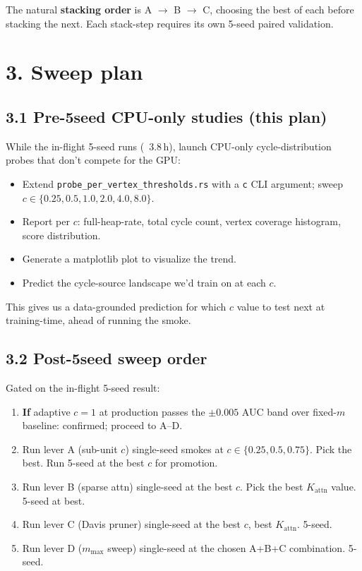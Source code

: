\documentclass[a4paper,11pt]{article}
\begin{document}
The natural \textbf{stacking order} is A $\to$ B $\to$ C, choosing
the best of each before stacking the next.  Each stack-step requires
its own 5-seed paired validation.

\section*{3. Sweep plan}

\subsection*{3.1 Pre-5seed CPU-only studies (this plan)}

While the in-flight 5-seed runs (~3.8\,h), launch CPU-only
cycle-distribution probes that don't compete for the GPU:

\begin{itemize}
  \item Extend \texttt{probe\_per\_vertex\_thresholds.rs} with a
    \texttt{c} CLI argument; sweep $c \in
    \{0.25, 0.5, 1.0, 2.0, 4.0, 8.0\}$.
  \item Report per $c$: full-heap-rate, total cycle count, vertex
    coverage histogram, score distribution.
  \item Generate a matplotlib plot to visualize the trend.
  \item Predict the cycle-source landscape we'd train on at each $c$.
\end{itemize}

This gives us a data-grounded prediction for which $c$ value to test
next at training-time, ahead of running the smoke.

\subsection*{3.2 Post-5seed sweep order}

Gated on the in-flight 5-seed result:

\begin{enumerate}
  \item \textbf{If} adaptive $c{=}1$ at production passes the
    $\pm 0.005$ AUC band over fixed-$m$ baseline: confirmed; proceed
    to A--D.
  \item Run lever A (sub-unit $c$) single-seed smokes at
    $c \in \{0.25, 0.5, 0.75\}$.  Pick the best.  Run 5-seed at the
    best $c$ for promotion.
  \item Run lever B (sparse attn) single-seed at the best $c$.  Pick
    the best $K_\text{attn}$ value.  5-seed at best.
  \item Run lever C (Davis pruner) single-seed at the best $c$,
    best $K_\text{attn}$.  5-seed.
  \item Run lever D ($m_\text{max}$ sweep) single-seed at the chosen
    A+B+C combination.  5-seed.
\end{enumerate}
\end{document}

